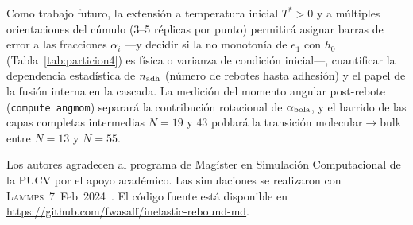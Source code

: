 \documentclass[aps,pre,twocolumn,reprint,superscriptaddress]{revtex4-2}
\newcommand{\Tstar}{T^*}
\newcommand{\lammps}{\textsc{Lammps}}
\begin{document}
Como trabajo futuro, la extensión a temperatura inicial $\Tstar>0$ y a
múltiples orientaciones del cúmulo (3--5 réplicas por punto) permitirá
asignar barras de error a las fracciones $\alpha_i$ ---y decidir si la no
monotonía de $e_1$ con $h_0$ (Tabla~\ref{tab:particion4}) es física o
varianza de condición inicial---, cuantificar la dependencia estadística de
$n_{\rm adh}$ (número de rebotes hasta adhesión) y el papel de la fusión
interna en la cascada. La medición del momento angular post-rebote
(\texttt{compute angmom}) separará la contribución rotacional de
$\alpha_{\rm bola}$, y el barrido de las capas completas intermedias
$N=19$ y $43$ poblará la transición molecular$\to$bulk entre
$N=13$ y $N=55$.

\begin{acknowledgments}

Los autores agradecen al programa de Magíster en Simulación Computacional de la
PUCV por el apoyo académico. Las simulaciones se realizaron con
\lammps~7~Feb~2024~\cite{Thompson2022}. El código fuente está disponible en
\url{https://github.com/fwasaff/inelastic-rebound-md}.
\end{acknowledgments}
\end{document}
